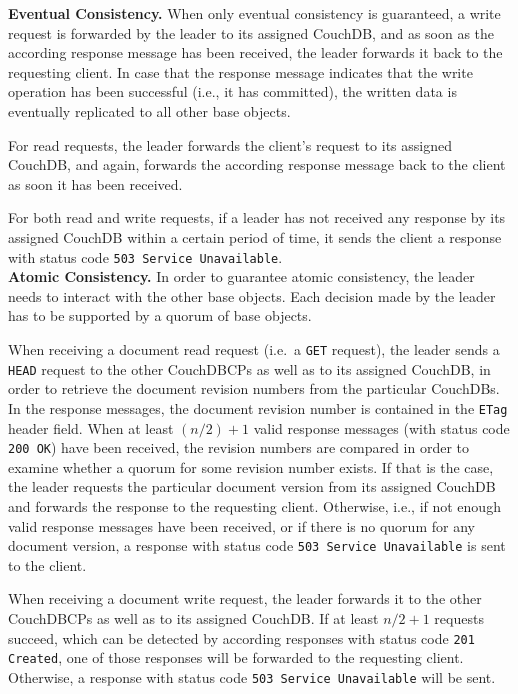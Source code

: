 \vspace{0.5em}
\noindent
{\bf Eventual Consistency.}
When only eventual consistency is guaranteed, a write request is forwarded by the leader to its assigned CouchDB, and as soon as the according response message has been received, the leader forwards it back to the requesting client. In case that the response message indicates that the write operation has been successful (i.e., it has committed), the written data is eventually replicated to all other base objects.

For read requests, the leader forwards the client's request to its assigned CouchDB, and again, forwards the according response message back to the client as soon it has been received.

For both read and write requests, if a leader has not received any response by its assigned CouchDB within a certain period of time, it sends the client a response with status code {\tt 503 Service Unavailable}.\\

\noindent
{\bf Atomic Consistency.}
In order to guarantee atomic consistency, the leader needs to interact with the other base objects. Each decision made by the leader has to be supported by a quorum of base objects.

When receiving a document read request (i.e.\ a {\tt GET} request), the leader sends a {\tt HEAD} request to the other CouchDBCPs as well as to its assigned CouchDB, in order to retrieve the document revision numbers from the particular CouchDBs. In the response messages, the document revision number is contained in the {\tt ETag} header field. When at least $(n / 2) + 1$ valid response messages (with status code {\tt 200 OK}) have been received, the revision numbers are compared in order to examine whether a quorum for some revision number exists. If that is the case, the leader requests the particular document version from its assigned CouchDB and forwards the response to the requesting client. Otherwise, i.e., if not enough valid response messages have been received, or if there is no quorum for any document version, a response with status code {\tt 503 Service Unavailable} is sent to the client.

When receiving a document write request, the leader forwards it to the other CouchDBCPs as well as to its assigned CouchDB. If at least $n / 2 + 1$ requests succeed, which can be detected by according responses with status code {\tt 201 Created}, one of those responses will be forwarded to the requesting client. Otherwise, a response with status code {\tt 503 Service Unavailable} will be sent.\\

